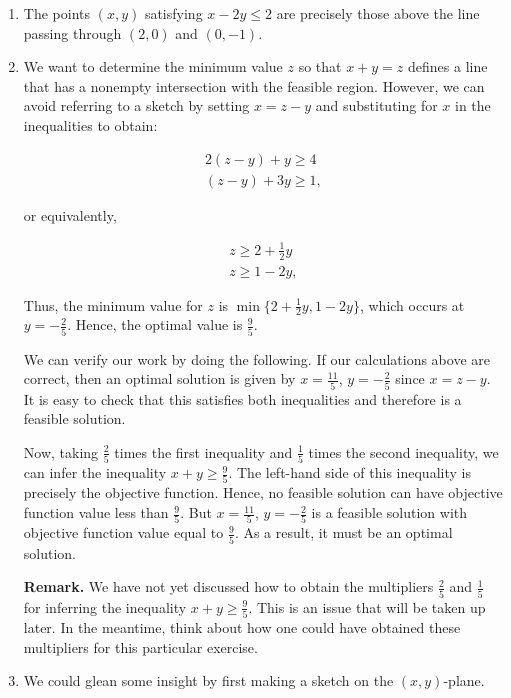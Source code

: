 \documentclass[]{book}
\theoremstyle{definition}
\theoremstyle{definition}
\theoremstyle{remark}
\begin{document}
\begin{enumerate}
\def\labelenumi{\arabic{enumi}.}
\item
  The points \((x,y)\) satisfying \(x-2y \leq 2\) are precisely those
  above the line passing through \((2,0)\) and \((0,-1)\).
\item
  We want to determine the minimum value \(z\) so that \(x+y=z\) defines
  a line that has a nonempty intersection with the feasible region.
  However, we can avoid referring to a sketch by setting \(x=z-y\) and
  substituting for \(x\) in the inequalities to obtain:

  \begin{eqnarray*}
   2(z-y) + y \geq 4 \\
   (z-y) + 3y \geq 1,
  \end{eqnarray*}

  or equivalently,

  \begin{eqnarray*}
   z \geq 2+\frac{1}{2}y \\
   z \geq 1-2y,
  \end{eqnarray*}

  Thus, the minimum value for \(z\) is
  \(\min \{ 2+\frac{1}{2}y, 1-2y\}\), which occurs at
  \(y = -\frac{2}{5}\). Hence, the optimal value is \(\frac{9}{5}\).

  We can verify our work by doing the following. If our calculations
  above are correct, then an optimal solution is given by
  \(x = \frac{11}{5}\), \(y = -\frac{2}{5}\) since \(x = z - y\). It is
  easy to check that this satisfies both inequalities and therefore is a
  feasible solution.

  Now, taking \(\frac{2}{5}\) times the first inequality and
  \(\frac{1}{5}\) times the second inequality, we can infer the
  inequality \(x+y \geq \frac{9}{5}\). The left-hand side of this
  inequality is precisely the objective function. Hence, no feasible
  solution can have objective function value less than \(\frac{9}{5}\).
  But \(x = \frac{11}{5}\), \(y = -\frac{2}{5}\) is a feasible solution
  with objective function value equal to \(\frac{9}{5}\). As a result,
  it must be an optimal solution.

  \textbf{Remark.} We have not yet discussed how to obtain the
  multipliers \(\frac{2}{5}\) and \(\frac{1}{5}\) for inferring the
  inequality \(x+y \geq \frac{9}{5}\). This is an issue that will be
  taken up later. In the meantime, think about how one could have
  obtained these multipliers for this particular exercise.
\item
  We could glean some insight by first making a sketch on the
  \((x,y)\)-plane.


\end{enumerate}
\end{document}
